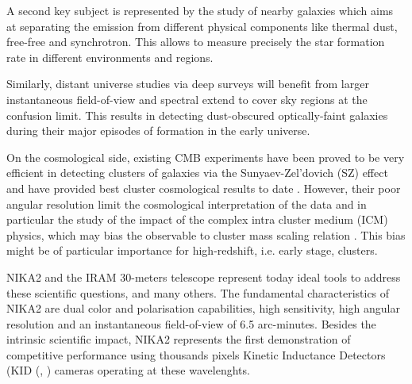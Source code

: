 \documentclass[]{aa} %
\begin{document}
A second key subject is represented by the study of nearby galaxies which aims at separating the emission from different physical components like thermal dust, free-free and synchrotron. This allows to measure precisely the star formation rate in different environments and regions. 

Similarly, distant universe studies via deep surveys will benefit from larger instantaneous field-of-view and spectral extend to cover sky regions at the confusion limit. This results in detecting dust-obscured optically-faint galaxies during their major episodes of formation in the early universe. 

On the cosmological side, existing CMB experiments have been proved to be very efficient in detecting clusters of galaxies via the Sunyaev-Zel\textquoteright dovich (SZ) effect \cite{plancksz,actsz,sptsz} and have provided best cluster cosmological results to date \cite{planckpapers}. However, their poor angular resolution limit the cosmological interpretation of the data and in particular the study of the impact of the complex intra cluster medium (ICM) physics, which may bias the observable to cluster mass scaling relation \cite{planckcosmo}. This bias might be of particular importance for high-redshift, i.e. early stage, clusters. 

NIKA2 and the IRAM 30-meters telescope represent today ideal tools to address these scientific questions, and many others. The fundamental characteristics of NIKA2 are dual color and polarisation capabilities, high sensitivity, high angular resolution and an instantaneous field-of-view of 6.5 arc-minutes. Besides the intrinsic scientific impact, NIKA2 represents the first demonstration of competitive performance using thousands pixels Kinetic Inductance Detectors (KID (\cite{Day2003}, \cite{Doyle2010}) cameras operating at these wavelenghts.

\end{document}

